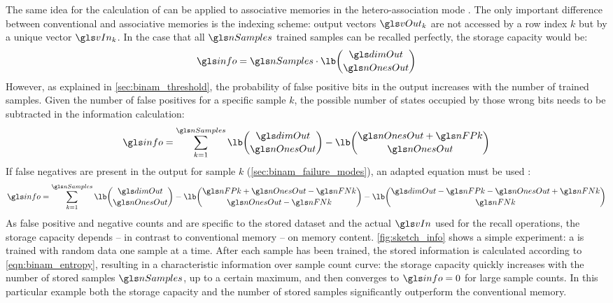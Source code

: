 The same idea for the calculation of \info can be applied to associative memories in the hetero-association mode \cite{palm1980associative}. The only important difference between conventional and associative memories is the indexing scheme: output vectors $\vOut_k$ are not accessed by a row index $k$ but by a unique vector $\vIn_k$. In the case that all $\nSamples$ trained samples can be recalled perfectly, the storage capacity would be:
\begin{align}
	\info = \nSamples \cdot \lb \binom{\dimOut}{\nOnesOut}
\end{align}
However, as explained in \cref{sec:binam_threshold}, the probability of false positive bits in the output increases with the number of trained samples. Given the number of false positives \nFPk for a specific sample $k$, the possible number of states occupied by those wrong bits needs to be subtracted in the information calculation:
\begin{align}
	\info = \sum_{k = 1}^{\nSamples} \lb \binom{\dimOut}{\nOnesOut} - \lb \binom{\nOnesOut + \nFPk}{\nOnesOut}
	\label{eqn:binam_entropy}
\end{align}
If \nFNk false negatives are present in the output for sample $k$ (\cref{sec:binam_failure_modes}), an adapted equation must be used \cite{ruckert1991tolerance}:
\begin{align}
	\info = \sum_{k = 1}^{\nSamples}
			\lb\binom{\dimOut}{\nOnesOut}
		  - \lb\binom{\nFPk + \nOnesOut - \nFNk}{\nOnesOut - \nFNk}
		  - \lb\binom{\dimOut - \nFPk - \nOnesOut + \nFNk}{\nFNk}
	\label{eqn:binam_entropy_false_negatives}
\end{align}
As false positive and negative counts \nFPk and \nFNk are specific to the stored dataset and the actual $\vIn$ used for the recall operations, the storage capacity depends -- in contrast to conventional memory -- on memory content. \cref{fig:sketch_info} shows a simple experiment: a \BiNAM is trained with random data one sample at a time. After each sample has been trained, the stored information is calculated according to \cref{eqn:binam_entropy}, resulting in a characteristic information over sample count curve:
the storage capacity \info quickly increases with the number of stored samples $\nSamples$, up to a certain maximum, and then converges to $\info = 0$ for large sample counts. In this particular example both the storage capacity \info and the number of stored samples significantly outperform the conventional memory.

